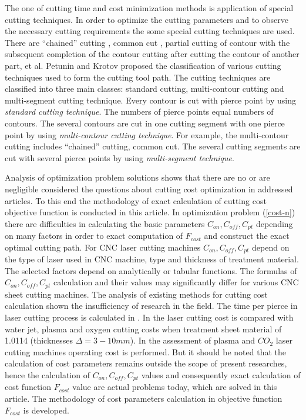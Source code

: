 \documentclass[runningheads]{llncs}
\begin{document}
The one of cutting time and cost minimization methods is
application of special cutting techniques.
In order to optimize the cutting parameters
and to observe the necessary cutting requirements
the some special cutting techniques are used.
There are ``chained'' cutting \cite{ru28},
common cut \cite{ru25}, partial cutting of contour
with the subsequent completion of the contour cutting
after cutting the contour of another part, et al.
Petunin and Krotov \cite{ru25} proposed the
classification of various cutting techniques
used to form the cutting tool path.
The cutting techniques are classified into three main classes:
standard cutting, multi-contour cutting and multi-segment cutting technique.
Every contour is cut with pierce point by using
\textit{standard cutting technique}.
The numbers of pierce points equal numbers of contours.
The several contours are cut in one cutting segment
with one pierce point by using
\textit{multi-contour cutting technique}.
For example, the multi-contour cutting includes ``chained'' cutting, common cut.
The several cutting segments are cut with several pierce points by using
\textit{multi-segment technique}.

Analysis of optimization problem solutions shows that
there are no or are negligible considered the questions
about cutting cost optimization in addressed articles.
To this end the methodology of exact calculation of
cutting cost objective function is conducted in this article.
In optimization problem (\ref{cost-n})
there are difficulties in calculating the basic parameters
$C_{on}, C_{off}, C_{pt}$
depending on many factors in order to exact computation of
$F_{cost}$
and construct the exact optimal cutting path.
For CNC laser cutting machines
$C_{on}, C_{off}, C_{pt}$
depend on the type of laser used in CNC machine,
type and thickness of treatment material.
The selected factors depend on analytically or tabular functions.
The formulas of
$C_{on}, C_{off}, C_{pt}$
calculation and their values may significantly differ
for various CNC sheet cutting machines.
The analysis of existing methods for cutting cost calculation
shown the insufficiency of research in the field.
The time per pierce in laser cutting process is calculated in
\cite{ru06}.
In \cite{ru07}
the laser cutting cost is compared with water jet,
plasma and oxygen cutting costs
when treatment sheet material of 1.0114
(thicknesses $\Delta=3-10 mm$).
In \cite{ru08}
the assessment of plasma and $CO_2$
laser cutting machines operating cost is performed.
But it should be noted that
the calculation of cost parameters
remains outside the scope of present researches,
hence the calculation of
$C_{on}, C_{off}, C_{pt}$
values and consequently exact calculation of cost function
$F_{cost}$
value are actual problems today,
which are solved in this article.
The methodology of cost parameters calculation in objective function
$F_{cost}$
is developed.
\end{document}
